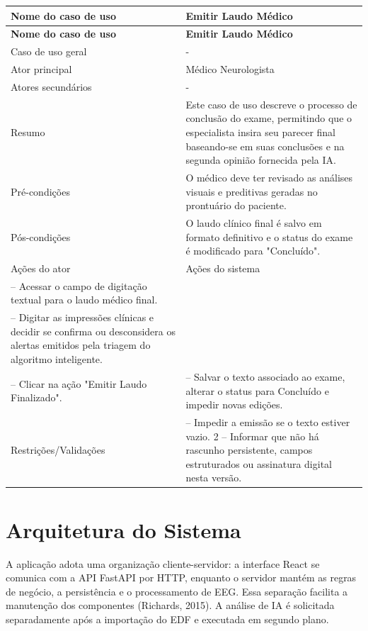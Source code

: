 \nopagebreak[4]
\begingroup
\fontsize{10}{12}\selectfont
\setlength{\tabcolsep}{3pt}
\renewcommand{\arraystretch}{1.15}
\addtocounter{table}{-1}
\begin{longtable}{|>{\raggedright\arraybackslash}p{}|>{\raggedright\arraybackslash}p{}|}
\hline
\textbf{Nome do caso de uso} & \textbf{Emitir Laudo Médico} \\ \hline
\endfirsthead
\hline
\textbf{Nome do caso de uso} & \textbf{Emitir Laudo Médico} \\ \hline
\endhead
Caso de uso geral & - \\ \hline
Ator principal & Médico Neurologista \\ \hline
Atores secundários & - \\ \hline
Resumo & Este caso de uso descreve o processo de conclusão do exame, permitindo que o especialista insira seu parecer final baseando-se em suas conclusões e na segunda opinião fornecida pela IA. \\ \hline
Pré-condições & O médico deve ter revisado as análises visuais e preditivas geradas no prontuário do paciente. \\ \hline
Pós-condições & O laudo clínico final é salvo em formato definitivo e o status do exame é modificado para "Concluído". \\ \hline
Ações do ator & Ações do sistema \\ \hline
1 – Acessar o campo de digitação textual para o laudo médico final. &  \\ \hline
2 – Digitar as impressões clínicas e decidir se confirma ou desconsidera os alertas emitidos pela triagem do algoritmo inteligente. &  \\ \hline
3 – Clicar na ação "Emitir Laudo Finalizado". & 4 – Salvar o texto associado ao exame, alterar o status para Concluído e impedir novas edições. \\ \hline
Restrições/Validações & 1 – Impedir a emissão se o texto estiver vazio. 2 – Informar que não há rascunho persistente, campos estruturados ou assinatura digital nesta versão. \\ \hline
\end{longtable}
\endgroup
{}
\section{Arquitetura do Sistema}
A aplicação adota uma organização cliente-servidor: a interface React se comunica com a API FastAPI por HTTP, enquanto o servidor mantém as regras de negócio, a persistência e o processamento de EEG. Essa separação facilita a manutenção dos componentes (Richards, 2015). A análise de IA é solicitada separadamente após a importação do EDF e executada em segundo plano.

